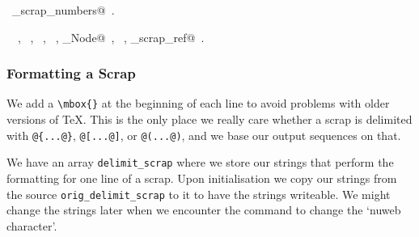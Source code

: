 \documentclass[a4paper]{report}
\begin{document}
\begin{flushleft}
\begin{minipage}{\linewidth}
\begin{list}{}{\setlength{\itemsep}{-\parsep}\setlength{\itemindent}{-\leftmargin}}
\item \NWtxtIdentsDefed\nobreak\  \verb@print_scrap_numbers@\nobreak\ .\item \NWtxtIdentsUsed\nobreak\  \verb@FALSE@\nobreak\ , \verb@FILE@\nobreak\ , \verb@fputs@\nobreak\ , \verb@scraps@\nobreak\ , \verb@Scrap_Node@\nobreak\ , \verb@TRUE@\nobreak\ , \verb@write_scrap_ref@\nobreak\ .
\item{}
\end{list}
\end{minipage}\vspace{4ex}
\end{flushleft}
\subsubsection{Formatting a Scrap}

We add a \verb|\mbox{}| at the beginning of each line to avoid
problems with older versions of \TeX.
This is the only place we really care whether a scrap is
delimited with \verb|@{...@}|, \verb|@[...@]|, or \verb|@(...@)|,
and we base our output sequences on that.

We have an array \texttt{delimit\_scrap} where we store our strings
that perform the formatting for one line of a scrap. Upon
initialisation we copy our strings from the source
\texttt{orig\_delimit\_scrap} to it to have the strings writeable.  We
might change the strings later when we encounter the command to change
the `nuweb character'.
\end{document}
